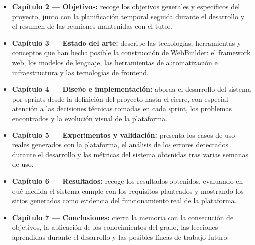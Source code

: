 \begin{itemize}
    \item \textbf{Capítulo 2 — Objetivos:} recoge los objetivos generales y específicos del proyecto, junto con la planificación temporal seguida durante el desarrollo y el resumen de las reuniones mantenidas con el tutor.

    \item \textbf{Capítulo 3 — Estado del arte:} describe las tecnologías, herramientas y conceptos que han hecho posible la construcción de WebBuilder: el framework web, los modelos de lenguaje, las herramientas de automatización e infraestructura y las tecnologías de frontend.

    \item \textbf{Capítulo 4 — Diseño e implementación:} aborda el desarrollo del sistema por sprints desde la definición del proyecto hasta el cierre, con especial atención a las decisiones técnicas tomadas en cada sprint, los problemas encontrados y la evolución visual de la plataforma.

    \item \textbf{Capítulo 5 — Experimentos y validación:} presenta los casos de uso reales generados con la plataforma, el análisis de los errores detectados durante el desarrollo y las métricas del sistema obtenidas tras varias semanas de uso.

    \item \textbf{Capítulo 6 — Resultados:} recoge los resultados obtenidos, evaluando en qué medida el sistema cumple con los requisitos planteados y mostrando los sitios generados como evidencia del funcionamiento real de la plataforma.

    \item \textbf{Capítulo 7 — Conclusiones:} cierra la memoria con la consecución de objetivos, la aplicación de los conocimientos del grado, las lecciones aprendidas durante el desarrollo y las posibles líneas de trabajo futuro.
\end{itemize}